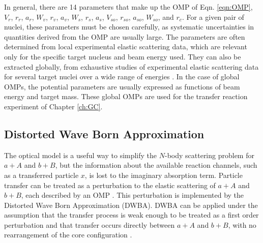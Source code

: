 In general, there are 14 parameters that make up the OMP of Eqn. \ref{eqn:OMP}, $V_{r}$, $r_{r}$, $a_{r}$, $W_{v}$, $r_{v}$, $a_{v}$, $W_{s}$, $r_{s}$, $a_{s}$, $V_{so}$, $r_{so}$, $a_{so}$, $W_{so}$, and $r_{c}$. For a given pair of nuclei, these parameters must be chosen carefully, as systematic uncertainties in quantities derived from the OMP are usually large. The parameters are often determined from local experimental elastic scattering data, which are relevant only for the specific target nucleus and beam energy used. They can also be extracted globally, from exhaustive studies of experimental elastic scattering data for several target nuclei over a wide range of energies \cite{An2006,Liang2009}. In the case of global OMPs, the potential parameters are usually expressed as functions of beam energy and target mass. These global OMPs are used for the transfer reaction experiment of Chapter \ref{ch:GC}.

\subsection{Distorted Wave Born Approximation} \label{subsec:DWBA}


The optical model is a useful way to simplify the $N$-body scattering problem for $a+A$ and $b+B$, but the information about the available reaction channels, such as a transferred particle $x$, is lost to the imaginary absorption term. Particle transfer can be treated as a perturbation to the elastic scattering of $a+A$ and $b+B$, each described by an OMP \cite{Satchler1983}. This perturbation is implemented by the Distorted Wave Born Approximation (DWBA). DWBA can be applied under the assumption that the transfer process is weak enough to be treated as a first order perturbation and that transfer occurs directly between $a+A$ and $b+B$, with no rearrangement of the core configuration \cite{Hammache2021}.

